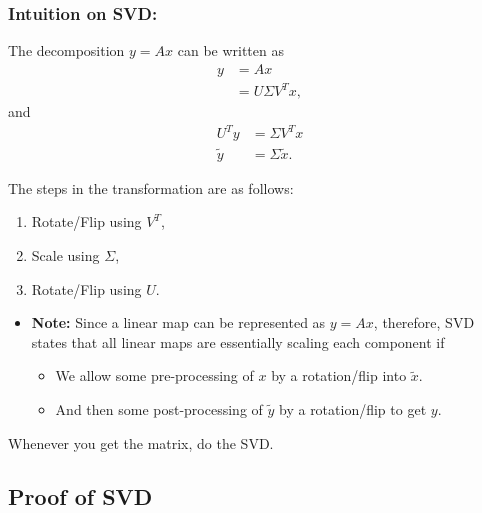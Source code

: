 \subsubsection{Intuition on SVD:}
\begin{intuition}
    The decomposition \( y = A x \) can be written as
    \begin{align*}
        y &= A x \\
        &= U \Sigma V^T x,
    \end{align*}
    and
    \begin{align*}
        U^T y &= \Sigma V^T x \\
        \tilde{y} &= \Sigma \tilde{x}.
    \end{align*}

    The steps in the transformation are as follows:
    \begin{enumerate}
        \item Rotate/Flip using \( V^T \),
        \item Scale using \( \Sigma \),
        \item Rotate/Flip using \( U \).
    \end{enumerate}
    \vspace{1em}

\begin{itemize}
    \item \textbf{Note:} Since a linear map can be represented as $y=Ax$, therefore, SVD states that all linear maps are essentially scaling each component if 
    \begin{itemize}
        \item We allow some pre-processing of \( x \) by a rotation/flip into \( \tilde{x} \). 
        \item And then some post-processing of \( \tilde{y} \) by a rotation/flip to get \( y \).
    \end{itemize}
\end{itemize}
\end{intuition}

\begin{warning}
    Whenever you get the matrix, do the SVD.
\end{warning}

\subsection{Proof of SVD}
